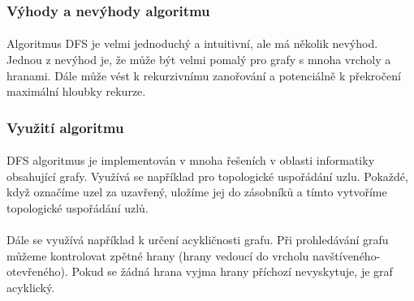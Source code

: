 \documentclass[12pt, titlepage, a4paper]{article}
\begin{document}
\subsubsection{Výhody a nevýhody algoritmu}
\paragraph{}
Algoritmus DFS je velmi jednoduchý a intuitivní, ale má několik nevýhod. Jednou z 
nevýhod je, že může být velmi pomalý pro grafy s mnoha vrcholy a hranami. Dále může 
vést k rekurzivnímu zanořování a potenciálně k překročení maximální hloubky rekurze.

\subsubsection{Využití algoritmu}
\paragraph{}
DFS algoritmus je implementován v mnoha řešeních v oblasti informatiky obsahující grafy. 
Využívá se například pro topologické uspořádání uzlu. Pokaždé, když označíme uzel za uzavřený, 
uložíme jej do zásobníků a tímto vytvoříme topologické uspořádání uzlů.
\paragraph{}
Dále se využívá například k určení acykličnosti grafu. Při prohledávání grafu můžeme kontrolovat zpětné hrany (hrany 
vedoucí do vrcholu navštíveného-otevřeného). Pokud se žádná hrana vyjma hrany příchozí 
nevyskytuje, je graf acyklický.

\newpage
\end{document}
